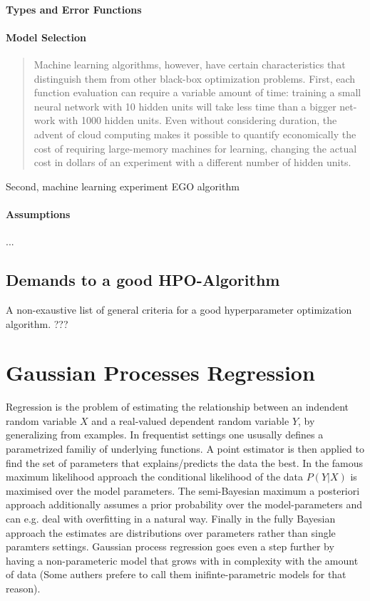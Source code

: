\documentclass[english]{article}
\begin{document}
\paragraph{Types and Error Functions}


\paragraph{Model Selection}



\begin{quote}
Machine learning algorithms, however, have certain characteristics that distinguish them from other black-box optimization problems.  First, each function evaluation can require a variable amount of time:  training a small neural network with 10 hidden units will take less time than a bigger net-work with 1000 hidden units.  Even without considering duration, the advent of cloud computing makes it possible to quantify economically the cost of requiring large-memory machines for learning, changing the actual cost in dollars of an experiment with a different number of hidden units.
\end{quote}
Second, machine learning experiment EGO algorithm


\paragraph{Assumptions}
...

\subsection{Demands to a good HPO-Algorithm}
A non-exaustive list of general criteria for a good hyperparameter optimization algorithm. ???


\section{Gaussian Processes Regression}
Regression is the problem of estimating the relationship between an indendent random variable $X$ and a real-valued dependent random variable $Y$, by generalizing from examples. In frequentist settings one ususally defines a parametrized familiy of underlying functions. A point estimator is then applied to find the set of parameters that explains/predicts the data the best. In the famous maximum likelihood approach the conditional likelihood of the data $P(Y|X)$ is maximised over the model parameters. The semi-Bayesian maximum a posteriori approach additionally assumes a prior probability over the model-parameters and can e.g. deal with overfitting in a natural way. Finally in the fully Bayesian approach the estimates are distributions over parameters rather than single paramters settings. Gaussian process regression goes even a step further by having a non-parameteric model that grows with in complexity with the amount of data (Some authers prefere to call them inifinte-parametric models for that reason).
\end{document}
